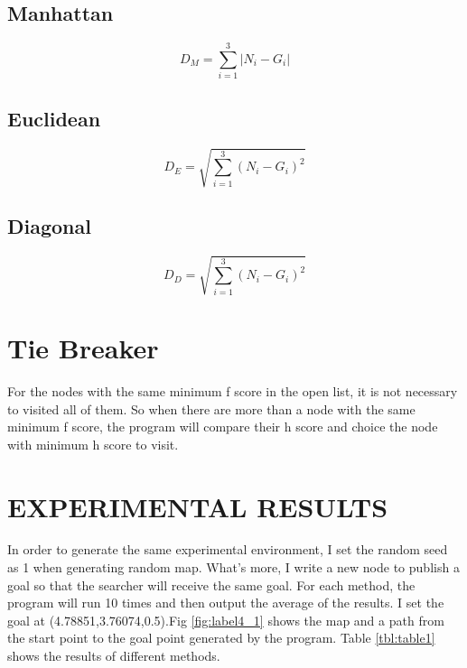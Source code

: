 \documentclass[conference]{IEEEtran}
\begin{document}
\subsection{Manhattan}

\begin{equation}
D_{M}=\sum_{i=1}^{3}{|N_i-G_i|}  \label{H1}
\end{equation}


\subsection{Euclidean}

\begin{equation}
D_{E}=\sqrt{\sum_{i=1}^{3}{(N_i-G_i)^2}} \label{H2}
\end{equation}

\subsection{Diagonal}

\begin{equation}
D_{D}=\sqrt{\sum_{i=1}^{3}{(N_i-G_i)^2}} \label{H3}
\end{equation}

\section{Tie Breaker}
For the nodes with the same minimum f score in the open list, it is not necessary to visited all of them. So when there are more than a node with the same minimum f score, the program will compare their h score and choice the node with minimum h score to visit.


\section{EXPERIMENTAL RESULTS}
In order to generate the same experimental environment, I set the random seed as 1 when generating random map. What's more, I write a new node to publish a goal so that the searcher will receive the same goal. For each method, the program will run 10 times and then output the average of the results. I set the goal at (4.78851,3.76074,0.5).Fig \ref{fig:label4_1} shows the map and a path from the start point to the goal point generated by the program. Table \ref {tbl:table1} shows the results of different methods. 
\end{document}
